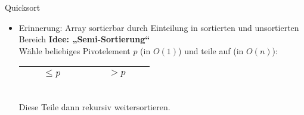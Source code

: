 



	

\iffalse

\begin{frame}{Zum letzten Übungsblatt}
	\textbf{Achtung bei der Wahl von Datenstrukturen} \\[0,125cm]
	\begin{itemize}
		\pause
		\item Aufgabenstellung spezifiziert nicht, ob eine Menge von Daten als Array oder Liste gegeben ist \impl Beides darf als Parametertyp gewählt werden
		\pause
		\item Aber: Wenn über die Daten iteriert wird, folgendes beachten:
		\pause
		\item Listen bieten Indexzugriff i.A. \textbf{nicht in konstanter Zeit}! D.h. wenn man „via Index“ über eine Liste iteriert, hat die Iteration eine Laufzeit von $\Theta(n^2)$
		\pause
		\item Daher: Iteration bei Arrays frei via Index oder \textit{for-each}, bei Listen \textbf{nur} \textit{for-each}, wenn die Laufzeit wichtig ist (bei Arrays und Listen kann davon ausgegangen werden, dass \textit{for-each} die Daten in linearer Reihenfolge durchläuft)
	\end{itemize}
\end{frame}

\fi



\begin{frame}{Quicksort}
	\begin{itemize}
		\item Erinnerung: Array sortierbar durch Einteilung in sortierten und unsortierten Bereich
		\pause
		\implitem \textbf{Idee: „Semi-Sortierung“} \\
		Wähle beliebiges Pivotelement $p$ (in $O(1)$) und teile auf (in $O(n)$):
		\begin{tabular}{|c|c|}
			\hline
			$\qquad \leq p \qquad$  & $\qquad > p \qquad$  \\
			\hline
		\end{tabular} \\
		\forcenewline
		Diese Teile dann rekursiv weitersortieren.
	\end{itemize}
\end{frame}


